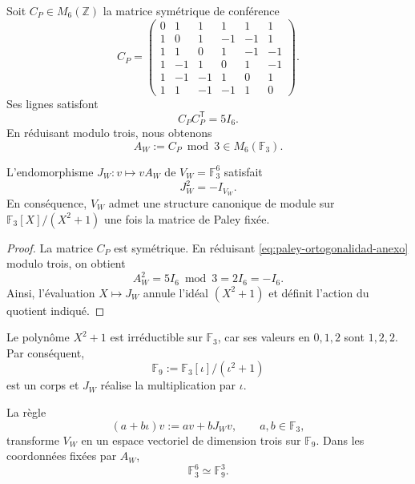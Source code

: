 Soit \(C_P\in M_6(\mathbb Z)\) la matrice symétrique de conférence
\begin{equation}
 C_P=
 \begin{pmatrix}
 0& 1& 1& 1& 1& 1\\
 1& 0& 1&-1&-1& 1\\
 1& 1& 0& 1&-1&-1\\
 1&-1& 1& 0& 1&-1\\
 1&-1&-1& 1& 0& 1\\
 1& 1&-1&-1& 1& 0
 \end{pmatrix}.
 \label{eq:paley-conferencia-anexo}
\end{equation}
Ses lignes satisfont
\begin{equation}
 C_P C_P^{\mathsf T}=5I_6.
 \label{eq:paley-ortogonalidad-anexo}
\end{equation}
En réduisant modulo trois, nous obtenons
\begin{equation}
 A_W:=C_P\bmod 3\in M_6(\mathbb F_3).
 \label{eq:paley-reduccion-anexo}
\end{equation}

\begin{theorem}
\label{thm:raiz-interna-menos-uno-anexo}
L'endomorphisme \(J_W:v\mapsto vA_W\) de
\(V_W=\mathbb F_3^6\) satisfait
\begin{equation}
 J_W^2=-I_{V_W}.
 \label{eq:Jw-cuadrado-anexo}
\end{equation}
En conséquence, \(V_W\) admet une structure canonique de module sur
\(\mathbb F_3[X]/(X^2+1)\) une fois la matrice de Paley fixée.
\end{theorem}

\begin{proof}
La matrice \(C_P\) est symétrique. En réduisant
\eqref{eq:paley-ortogonalidad-anexo} modulo trois, on obtient
\[
 A_W^2=5I_6\bmod3=2I_6=-I_6.
\]
Ainsi, l'évaluation \(X\mapsto J_W\) annule l'idéal
\((X^2+1)\) et définit l'action du quotient indiqué.
\end{proof}

Le polynôme \(X^2+1\) est irréductible sur \(\mathbb F_3\), car ses
valeurs en \(0,1,2\) sont \(1,2,2\). Par conséquent,
\begin{equation}
 \mathbb F_9:=\mathbb F_3[\iota]/(\iota^2+1)
 \label{eq:F9-desde-paley-anexo}
\end{equation}
est un corps et \(J_W\) réalise la multiplication par \(\iota\).

\begin{corollary}
\label{cor:F3seis-F9tres-anexo}
La règle
\begin{equation}
 (a+b\iota)v:=av+bJ_Wv,
 \qquad a,b\in\mathbb F_3,
 \label{eq:accion-F9-anexo}
\end{equation}
transforme \(V_W\) en un espace vectoriel de dimension trois sur
\(\mathbb F_9\). Dans les coordonnées fixées par \(A_W\),
\begin{equation}
 \mathbb F_3^6\simeq\mathbb F_9^3.
 \label{eq:F3seis-igual-F9tres-anexo}
\end{equation}
\end{corollary}

